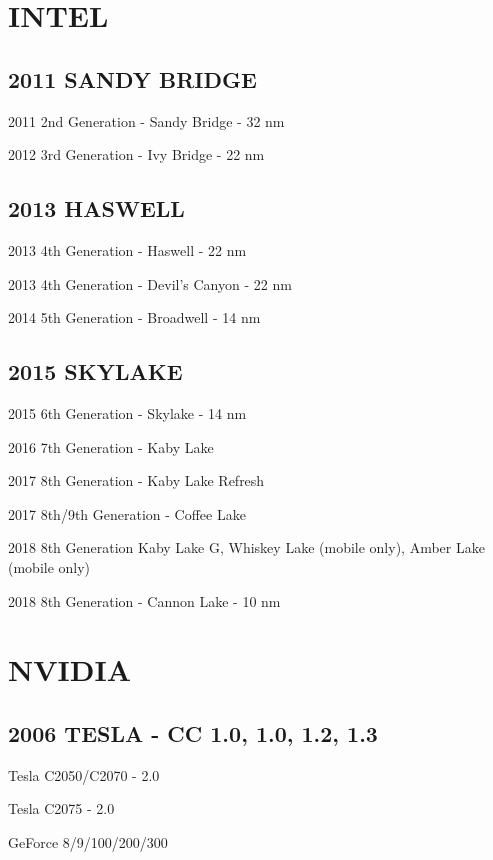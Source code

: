 \documentclass{article}
\begin{document}
\section{INTEL}
\subsection{2011 SANDY BRIDGE}

\indent \par 2011 2nd Generation - Sandy Bridge - 32 nm 

2012 3rd Generation - Ivy Bridge - 22 nm

\subsection{2013 HASWELL}
\indent \par 2013 4th Generation - Haswell - 22 nm

2013 4th Generation - Devil's Canyon - 22 nm

2014 5th Generation - Broadwell - 14 nm


\subsection{2015 SKYLAKE}
\indent \par 2015 6th Generation - Skylake - 14 nm

2016 7th Generation - Kaby Lake

2017 8th Generation - Kaby Lake Refresh

2017 8th/9th Generation  - Coffee Lake 

2018 8th Generation Kaby Lake G, Whiskey Lake (mobile only), Amber Lake (mobile only)

2018 8th Generation - Cannon Lake - 10 nm



\section{NVIDIA}

\subsection{2006 TESLA - CC 1.0, 1.0, 1.2, 1.3}
\indent \par Tesla C2050/C2070 - 2.0

Tesla C2075 - 2.0

GeForce 8/9/100/200/300
\end{document}
